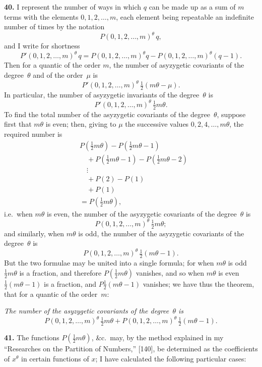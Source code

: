 \documentclass[11pt]{article}
\begin{document}
\textbf{40.} I represent the number of ways in which $q$ can be made up as a sum of $m$ terms with the elements $0, 1, 2, \ldots, m$, each element being repeatable an indefinite number of times by the notation
\[
P(0, 1, 2, \ldots, m)^\theta\, q,
\]
and I write for shortness
\[
P'(0, 1, 2, \ldots, m)^\theta\, q = P(0, 1, 2, \ldots, m)^\theta q - P(0, 1, 2, \ldots, m)^\theta (q-1).
\]
Then for a quantic of the order $m$, the number of asyzygetic covariants of the degree~$\theta$ and of the order~$\mu$ is
\[
P'(0, 1, 2, \ldots, m)^\theta\,\tfrac{1}{2}(m\theta - \mu).
\]
In particular, the number of asyzygetic invariants of the degree~$\theta$ is
\[
P'(0, 1, 2, \ldots, m)^\theta\,\tfrac{1}{2}m\theta.
\]
To find the total number of the asyzygetic covariants of the degree~$\theta$, suppose first that $m\theta$ is even; then, giving to $\mu$ the successive values $0, 2, 4, \ldots, m\theta$, the required number is
\begin{align*}
&P(\tfrac{1}{2}m\theta) - P(\tfrac{1}{2}m\theta - 1) \\
&\quad + P(\tfrac{1}{2}m\theta - 1) - P(\tfrac{1}{2}m\theta - 2) \\
&\quad \vdots \\
&\quad + P(2) - P(1) \\
&\quad + P(1) \\
&= P(\tfrac{1}{2}m\theta),
\end{align*}
i.e.\ when $m\theta$ is even, the number of the asyzygetic covariants of the degree~$\theta$ is
\[
P(0, 1, 2, \ldots, m)^\theta\,\tfrac{1}{2}m\theta;
\]
and similarly, when $m\theta$ is odd, the number of the asyzygetic covariants of the degree~$\theta$ is
\[
P(0, 1, 2, \ldots, m)^\theta\,\tfrac{1}{2}(m\theta - 1).
\]
But the two formulae may be united into a single formula; for when $m\theta$ is odd $\tfrac{1}{2}m\theta$ is a fraction, and therefore $P(\tfrac{1}{2}m\theta)$ vanishes, and so when $m\theta$ is even $\tfrac{1}{2}(m\theta - 1)$ is a fraction, and $P\tfrac{1}{2}(m\theta - 1)$ vanishes; we have thus the theorem, that for a quantic of the order~$m$:

\textit{The number of the asyzygetic covariants of the degree~$\theta$ is}
\[
P(0, 1, 2, \ldots, m)^\theta\,\tfrac{1}{2}m\theta + P(0, 1, 2, \ldots, m)^\theta\,\tfrac{1}{2}(m\theta - 1).
\]

\textbf{41.} The functions $P(\tfrac{1}{2}m\theta)$, \&c.\ may, by the method explained in my ``Researches on the Partition of Numbers,'' [140], be determined as the coefficients of $x^\theta$ in certain functions of $x$; I have calculated the following particular cases:
\end{document}
